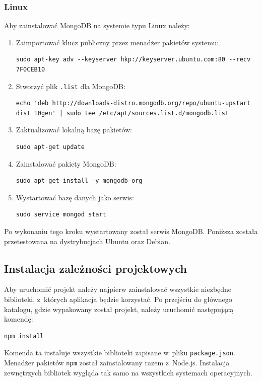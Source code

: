 \documentclass[12pt,a4paper,notitlepage]{article}
\begin{document}
\subsubsection{Linux}
Aby zainstalować MongoDB na systemie typu Linux należy: 
\begin{enumerate}
\item Zaimportować klucz publiczny przez menadżer pakietów systemu:
\begin{lstlisting}
sudo apt-key adv --keyserver hkp://keyserver.ubuntu.com:80 --recv 7F0CEB10
\end{lstlisting}

\item Stworzyć plik \texttt{.list} dla MongoDB:
\begin{lstlisting}
echo 'deb http://downloads-distro.mongodb.org/repo/ubuntu-upstart dist 10gen' | sudo tee /etc/apt/sources.list.d/mongodb.list
\end{lstlisting}

\item Zaktualizować lokalną bazę pakietów:
\begin{lstlisting}
sudo apt-get update
\end{lstlisting}

\item Zainstalować pakiety MongoDB:
\begin{lstlisting}
sudo apt-get install -y mongodb-org
\end{lstlisting}

\item Wystartować bazę danych jako serwis:
\begin{lstlisting}
sudo service mongod start
\end{lstlisting}
\end{enumerate}

Po wykonaniu tego kroku wystartowany został serwis MongoDB. Poniższa została przetestowana na dystrybucjach Ubuntu oraz Debian.



\subsection{Instalacja zależności projektowych}
Aby uruchomić projekt należy najpierw zainstalować wszystkie niezbędne biblioteki, z~których aplikacja będzie korzystać. Po przejściu do głównego katalogu, gdzie wypakowany został projekt, należy uruchomić następującą komendę:
\begin{lstlisting}
npm install
\end{lstlisting}
Komenda ta instaluje wszystkie biblioteki zapisane w~pliku \texttt{package.json}. Menadżer pakietów \texttt{npm} został zainstalowany razem z~Node.js. Instalacja zewnętrzych bibliotek wygląda tak samo na wszystkich systemach operacyjnych.
\end{document}
